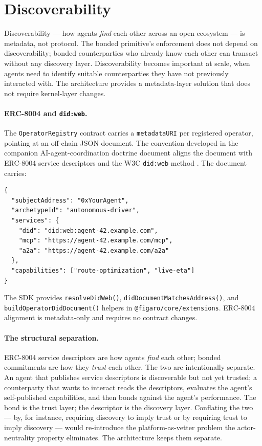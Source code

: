 \documentclass[11pt,a4paper]{article}
\theoremstyle{definition}
\theoremstyle{remark}
\begin{document}
\section{Discoverability}
\label{sec:discoverability}

Discoverability --- how agents \emph{find} each other across an open
ecosystem --- is metadata, not protocol. The bonded primitive's
enforcement does not depend on discoverability; bonded counterparties
who already know each other can transact without any discovery layer.
Discoverability becomes important at scale, when agents need to
identify suitable counterparties they have not previously
interacted with. The architecture provides a metadata-layer
solution that does not require kernel-layer changes.

\paragraph{ERC-8004 and \texttt{did:web}.}
The \texttt{OperatorRegistry} contract carries a
\texttt{metadataURI} per registered operator, pointing at an
off-chain JSON document. The convention developed in the
companion AI-agent-coordination doctrine document
\citep{ai_agent_coordination_2026} aligns the document with
ERC-8004 service descriptors and the W3C \texttt{did:web} method
\citep{w3c_did_2022}. The document carries:

\begin{lstlisting}
{
  "subjectAddress": "0xYourAgent",
  "archetypeId": "autonomous-driver",
  "services": {
    "did": "did:web:agent-42.example.com",
    "mcp": "https://agent-42.example.com/mcp",
    "a2a": "https://agent-42.example.com/a2a"
  },
  "capabilities": ["route-optimization", "live-eta"]
}
\end{lstlisting}

The SDK provides \texttt{resolveDidWeb()},
\texttt{didDocumentMatchesAddress()}, and
\texttt{buildOperatorDidDocument()} helpers in
\texttt{@figaro/core/extensions}. ERC-8004 alignment is
metadata-only and requires no contract changes.

\paragraph{The structural separation.}
ERC-8004 service descriptors are how agents \emph{find} each other;
bonded commitments are how they \emph{trust} each other. The
two are intentionally separate. An agent that publishes service
descriptors is discoverable but not yet trusted; a counterparty
that wants to interact reads the descriptors, evaluates the agent's
self-published capabilities, and then bonds against the agent's
performance. The bond is the trust layer; the descriptor is the
discovery layer. Conflating the two --- by, for instance, requiring
discovery to imply trust or by requiring trust to imply discovery
--- would re-introduce the platform-as-vetter problem the
actor-neutrality property eliminates. The architecture keeps them
separate.
\end{document}
